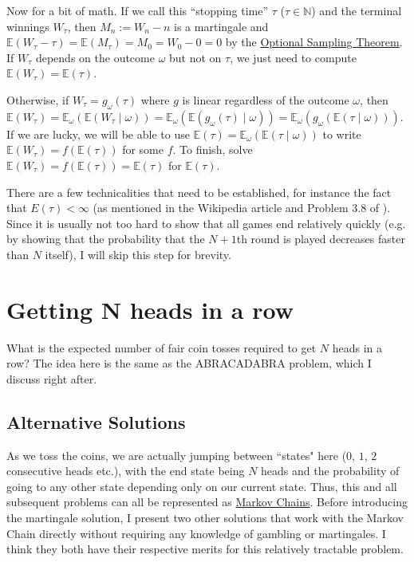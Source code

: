 \documentclass[11pt]{article}
\newcommand{\N}{\mathbb{N}}
\newcommand{\E}{\mathbb{E}}
\begin{document}
Now for a bit of math. If we call this ``stopping time'' $\tau$ ($\tau \in \N$) and the terminal winnings $W_\tau$, then $M_n := W_n - n$ is a martingale and $\E(W_\tau - \tau) = \E(M_\tau) = M_0 = W_0 - 0 = 0$ by the \href{https://en.wikipedia.org/wiki/Optional_stopping_theorem}{Optional Sampling Theorem}. If $W_\tau$ depends on the outcome $\omega$ but not on $\tau$, we just need to compute $\E(W_\tau) = \E(\tau)$.

Otherwise, if $W_\tau = g_\omega(\tau)$ where $g$ is linear regardless of the outcome $\omega$, then $\E(W_\tau) = \E_\omega(\E(W_\tau \mid \omega)) = \E_\omega(\E(g_\omega(\tau)\mid\omega)) = \E_\omega(g_\omega(\E(\tau\mid \omega)))$. If we are lucky, we will be able to use $\E(\tau) = \E_\omega(\E(\tau \mid \omega))$ to write $\E(W_\tau) = f(\E(\tau))$ for some $f$. To finish, solve $\E(W_\tau) = f(\E(\tau)) = \E(\tau)$ for $\E(\tau)$.

There are a few technicalities that need to be established, for instance the fact that $E(\tau) < \infty$ (as mentioned in the Wikipedia article and Problem 3.8 of \cite{joshi2008quant}). Since it is usually not too hard to show that all games end relatively quickly (e.g. by showing that the probability that the $N+1$th round is played decreases faster than $N$ itself), I will skip this step for brevity.


\section{Getting N heads in a row}

What is the expected number of fair coin tosses required to get $N$ heads in a row? The idea here is the same as the ABRACADABRA problem, which I discuss right after.

\subsection{Alternative Solutions}
As we toss the coins, we are actually jumping between ``states" here ($0$, $1$, $2$ consecutive heads etc.), with the end state being $N$ heads and the probability of going to any other state depending only on our current state. Thus, this and all subsequent problems can all be represented as \href{https://en.wikipedia.org/wiki/Markov_chain}{Markov Chains}. Before introducing the martingale solution, I present two other solutions that work with the Markov Chain directly without requiring any knowledge of gambling or martingales. I think they both have their respective merits for this relatively tractable problem.
\end{document}
